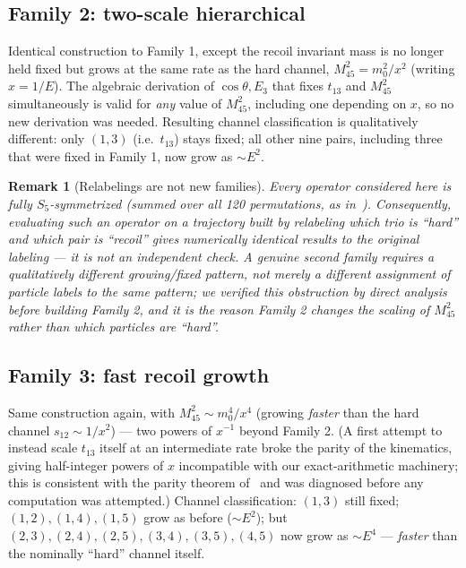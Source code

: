 \documentclass[reqno]{amsart}
\newtheorem{remark}[theorem]{Remark}
\begin{document}
\subsection{Family 2: two-scale hierarchical}
\label{sec:family2}

Identical construction to Family 1, except the recoil invariant mass is no longer held fixed but
grows at the same rate as the hard channel, $M_{45}^2=m_0^2/x^2$ (writing $x=1/E$). The algebraic
derivation of $\cos\theta,E_3$ that fixes $t_{13}$ and $M_{45}^2$ simultaneously is valid for
\emph{any} value of $M_{45}^2$, including one depending on $x$, so no new derivation was needed.
Resulting channel classification is qualitatively different: only $(1,3)$ (i.e.\ $t_{13}$) stays
fixed; all other nine pairs, including three that were fixed in Family 1, now grow as $\sim E^2$.

\begin{remark}[Relabelings are not new families]
\label{rem:relabel}
Every operator considered here is fully $S_5$-symmetrized (summed over all 120 permutations, as
in~\cite{fivephotons}). Consequently, evaluating such an operator on a trajectory built by
relabeling which trio is ``hard'' and which pair is ``recoil'' gives numerically \emph{identical}
results to the original labeling --- it is not an independent check. A genuine second family
requires a qualitatively different growing/fixed pattern, not merely a different assignment of
particle labels to the same pattern; we verified this obstruction by direct analysis before
building Family 2, and it is the reason Family 2 changes the scaling of $M_{45}^2$ rather than
which particles are ``hard''.
\end{remark}

\subsection{Family 3: fast recoil growth}
\label{sec:family3}

Same construction again, with $M_{45}^2\sim m_0^4/x^4$ (growing \emph{faster} than the hard channel
$s_{12}\sim1/x^2$) --- two powers of $x^{-1}$ beyond Family 2. (A first attempt to instead scale
$t_{13}$ itself at an intermediate rate broke the parity of the kinematics, giving half-integer
powers of $x$ incompatible with our exact-arithmetic machinery; this is consistent with the parity
theorem of~\cite{fivephotons} and was diagnosed before any computation was attempted.) Channel
classification: $(1,3)$ still fixed; $(1,2),(1,4),(1,5)$ grow as before ($\sim E^2$); but
$(2,3),(2,4),(2,5),(3,4),(3,5),(4,5)$ now grow as $\sim E^4$ --- \emph{faster} than the nominally
``hard'' channel itself.
\end{document}
